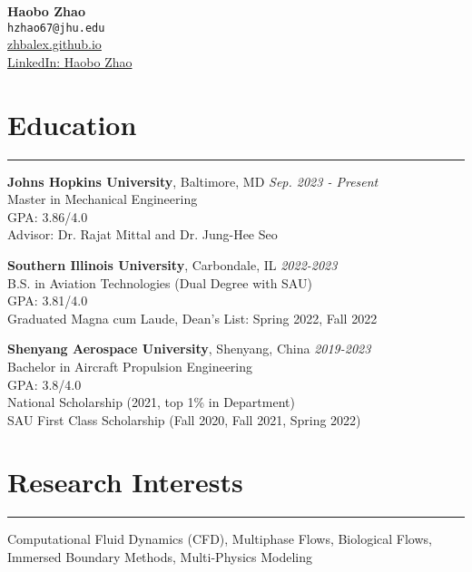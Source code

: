 \documentclass[11pt]{article}
\begin{document}

\begin{center}
    {\LARGE \textbf{Haobo Zhao}} \\
    \vspace{2mm}
    \small
    \texttt{hzhao67@jhu.edu} \\
    \vspace{1mm}
    \href{https://zhbalex.github.io}{zhbalex.github.io} \\
    \href{https://www.linkedin.com/in/haobo-zhao-035529229}{LinkedIn: Haobo Zhao}
\end{center}

\vspace{2mm}

\section*{Education}
\hrule

\noindent\textbf{Johns Hopkins University}, Baltimore, MD \hfill \textit{Sep. 2023 - Present} \\
Master in Mechanical Engineering \\
GPA: 3.86/4.0 \\
Advisor: Dr. Rajat Mittal and Dr. Jung-Hee Seo

\vspace{2mm}

\noindent\textbf{Southern Illinois University}, Carbondale, IL \hfill \textit{2022-2023} \\
B.S. in Aviation Technologies (Dual Degree with SAU) \\
GPA: 3.81/4.0 \\
Graduated Magna cum Laude, Dean's List: Spring 2022, Fall 2022

\vspace{2mm}

\noindent\textbf{Shenyang Aerospace University}, Shenyang, China \hfill \textit{2019-2023} \\
Bachelor in Aircraft Propulsion Engineering \\
GPA: 3.8/4.0 \\
National Scholarship (2021, top 1\% in Department) \\
SAU First Class Scholarship (Fall 2020, Fall 2021, Spring 2022)

\vspace{2mm}

\section*{Research Interests}
\hrule
Computational Fluid Dynamics (CFD), Multiphase Flows, Biological Flows, Immersed Boundary Methods, Multi-Physics Modeling
\end{document}
